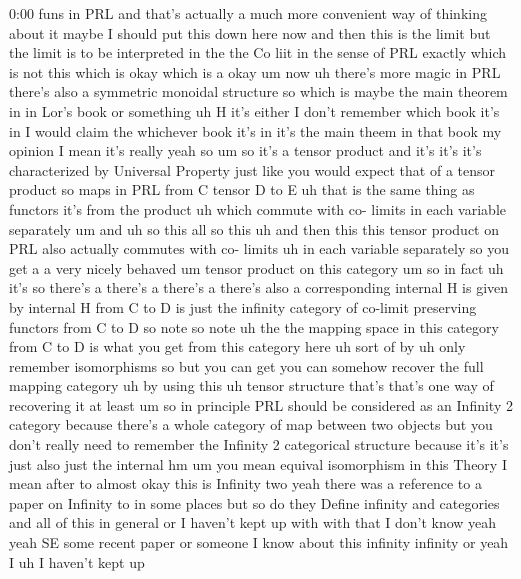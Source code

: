 \begin{unfinished}{0:00}
funs  in
PRL  and  that's  actually  a  much  more
convenient  way  of  thinking  about
it  maybe  I  should  put  this  down  here
now  and  then  this  is  the
limit  but  the  limit  is  to  be  interpreted
in  the  the  Co  liit  in  the  sense  of  PRL
exactly  which  is  not  this  which
is  okay  which  is
a
okay  um
now  uh  there's  more  magic  in  PRL  there's
also  a  symmetric  monoidal
structure  so  which  is  maybe  the  main
theorem  in  in
Lor's  book  or  something
uh  H  it's  either  I  don't  remember  which
book  it's  in  I  would  claim  the  whichever
book  it's  in  it's  the  main  theem  in  that
book  my  opinion  I  mean  it's  really  yeah
so  um  so  it's  a  tensor  product  and  it's
it's  it's  characterized  by  Universal
Property  just  like  you  would  expect  that
of  a  tensor  product  so  maps  in  PRL  from
C  tensor  D  to  E
uh  that  is  the  same  thing  as
functors  it's  from  the
product  uh  which  commute  with  co-
limits  in  each  variable
separately  um
and
uh  so  this  all  so  this  uh  and  then  this
this  tensor  product  on
PRL  also  actually  commutes  with  co-
limits
uh  in  each  variable
separately  so  you  get  a  a  very  nicely
behaved  um  tensor  product  on  this
category
um  so  in  fact  uh  it's
so  there's  a  there's  a  there's  a  there's
also  a  corresponding  internal
H  is  given
by  internal  H  from  C  to  D  is  just  the
infinity  category  of  co-limit  preserving
functors  from  C  to  D
so
note  so  note  uh  the  the  mapping  space  in
this  category  from  C  to
D  is  what  you  get  from  this  category
here  uh  sort
of  by  uh  only  remember  isomorphisms
so  but  you  can  get  you  can  somehow
recover  the  full  mapping  category  uh  by
using  this  uh  tensor  structure  that's
that's  one  way  of  recovering  it  at
least
um  so  in  principle  PRL  should  be
considered  as  an  Infinity  2  category
because  there's  a  whole  category  of  map
between  two  objects  but  you  don't  really
need  to  remember  the  Infinity  2
categorical  structure  because  it's  it's
just  also  just  the  internal
hm
um  you  mean
equival  isomorphism  in  this  Theory  I
mean  after  to  almost
okay  this  is  Infinity
two  yeah  there  was  a  reference  to  a
paper  on  Infinity  to  in  some  places  but
so  do  they  Define  infinity  and
categories  and  all  of  this  in  general  or
I  haven't  kept  up  with  with  that  I  don't
know  yeah  yeah  SE  some  recent  paper  or
someone  I  know  about  this  infinity
infinity  or  yeah  I  uh  I  haven't  kept  up

\end{unfinished}
